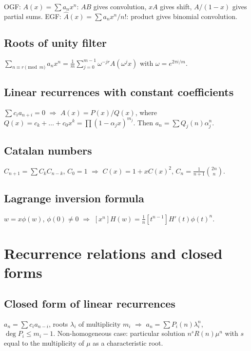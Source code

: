 OGF: $A(x)=\sum a_n x^n$: $AB$ gives convolution, $x A$ gives shift, $A/(1-x)$ gives partial sums.
EGF: $\hat A(x)=\sum a_n x^n/n!$: product gives binomial convolution.

\subsection{Roots of unity filter}
\label{subsec:roots-unity-filter}

$\sum_{n\equiv r\pmod m}a_n x^n=\frac1m\sum_{j=0}^{m-1}\omega^{-jr}A(\omega^j x)$ with $\omega=e^{2\pi i/m}$.

\subsection{Linear recurrences with constant coefficients}
\label{subsec:linear-recurrence}

$\sum c_i a_{n+i}=0$ $\Rightarrow$ $A(x)=P(x)/Q(x)$, where $Q(x)=c_k+\dots+c_0x^k=\prod(1-\alpha_j x)^{m_j}$. Then $a_n=\sum Q_j(n)\alpha_j^n$.

\subsection{Catalan numbers}
\label{subsec:catalan}

$C_{n+1}=\sum C_k C_{n-k}$, $C_0=1$ $\Rightarrow$ $C(x)=1+x C(x)^2$, $C_n=\frac1{n+1}\binom{2n}{n}$.

\subsection{Lagrange inversion formula}
\label{subsec:lagrange-inversion}

$w=x\phi(w)$, $\phi(0)\ne 0$ $\Rightarrow$ $[x^n]H(w)=\frac1n[t^{n-1}] H'(t)\phi(t)^n$.

\medskip

\section{Recurrence relations and closed forms}
\label{sec:recurrences}

\subsection{Closed form of linear recurrences}
\label{subsec:closed-form-recurrence}

$a_n=\sum c_i a_{n-i}$, roots $\lambda_i$ of multiplicity $m_i$ $\Rightarrow$ $a_n=\sum P_i(n)\lambda_i^n$, $\deg P_i\le m_i-1$. Non-homogeneous case: particular solution $n^s R(n)\mu^n$ with $s$ equal to the multiplicity of $\mu$ as a characteristic root.

